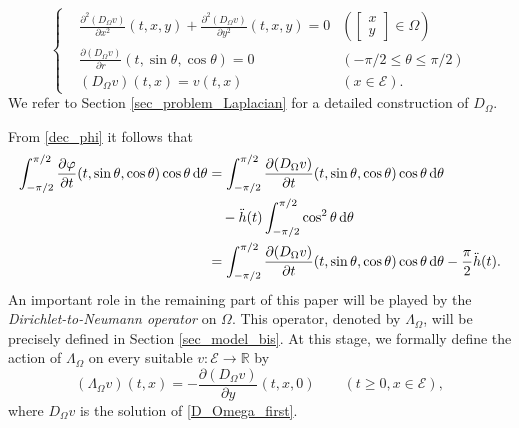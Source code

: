 \documentclass{amsart} %
\numberwithin{equation}{section}
\theoremstyle{definition}
\begin{document}
\begin{equation}\label{D_Omega_first}
\left\{
\begin{aligned}
 &\frac{\partial^2(D_{\Omega}v)}{\partial x^2}(t,x,y)+\frac{\partial^2(D_{\Omega}v)}{\partial y^2}(t,x,y)=0 &\left(\begin{bmatrix}x\\y\end{bmatrix}\in\Omega\right)\\
 &\frac{\partial(D_{\Omega}v)}{\partial r}(t,\sin\theta,\cos\theta)=0 &(-\pi/2\leqslant\theta\leqslant\pi/2)\\
 &(D_{\Omega}v)(t,x)=v(t,x) &(x\in\mathcal{E}).
\end{aligned}
\right.
\end{equation}
We refer to Section \ref{sec_problem_Laplacian} for a detailed construction of $D_\Omega$. 

From \eqref{dec_phi} it follows that
\begin{equation}
\begin{aligned}
\int_{-\pi/2}^{\pi/2}\frac{\partial\varphi}{\partial t}(t,\sin\theta,\cos\theta)\cos\theta \, {\rm d}\theta&=\int_{-\pi/2}^{\pi/2}\frac{\partial(D_{\Omega} v)}{\partial t}(t,\sin\theta,\cos\theta)\cos\theta\,{\rm d}\theta\\
&\quad-\ddot{h}(t)\int_{-\pi/2}^{\pi/2}\cos^2\theta\,{\rm d}\theta\\
&=\int_{-\pi/2}^{\pi/2}\frac{\partial(D_{\Omega}v)}{\partial t}(t,\sin\theta,\cos\theta)\cos\theta\,{\rm d}\theta-\frac{\pi}{2}\ddot{h}(t).
\end{aligned}
\end{equation}
 An important role in the remaining part of this paper will be played by the {\em Dirichlet-to-Neumann operator} on $\Omega$. This operator, denoted 
 by $\Lambda_\Omega$, will be precisely defined in Section \ref{sec_model_bis}. At this stage, we formally define the action of $\Lambda_\Omega$ on 
 every suitable $v:\mathcal{E}\to \mathbb{R}$  by
\begin{equation}
    (\Lambda_{\Omega}v)(t,x)=-\frac{\partial (D_{\Omega}v)}{\partial y}(t,x,0)\qquad(t\geqslant 0, x\in\mathcal{E}),
\end{equation}
where $D_\Omega v$ is the solution of \eqref{D_Omega_first}.
\end{document}

